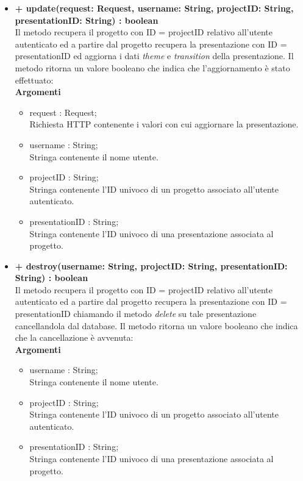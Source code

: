 \begin{itemize}
			\item \textbf{+ update(request: Request, username: String, projectID: String, presentationID: String) : boolean}\\
			Il metodo recupera il progetto con ID = projectID relativo all'utente autenticato ed a partire dal progetto recupera la presentazione con ID = presentationID ed aggiorna i dati \textit{theme} e \textit{transition} della presentazione. Il metodo ritorna un valore booleano che indica che l'aggiornamento è stato effettuato:\\
			\textbf{Argomenti}
			\begin{itemize}
				\item request : Request;\\
				Richiesta HTTP contenente i valori con cui aggiornare la presentazione.
				\item username : String; \\
				Stringa contenente il nome utente.
				\item projectID : String; \\
				Stringa contenente l'ID univoco di un progetto associato all'utente autenticato.
				\item presentationID : String; \\
				Stringa contenente l'ID univoco di una presentazione associata al progetto.
			\end{itemize}
			\newpage
			\item \textbf{+ destroy(username: String, projectID: String, presentationID: String) : boolean}\\
			Il metodo recupera il progetto con ID = projectID relativo all'utente autenticato ed a partire dal progetto recupera la presentazione con ID = presentationID chiamando il metodo \textit{delete} su tale presentazione cancellandola dal \gls{database}. Il metodo ritorna un valore booleano che indica che la cancellazione è avvenuta:\\
			\textbf{Argomenti}
			\begin{itemize}
				\item username : String; \\
				Stringa contenente il nome utente.
				\item projectID : String; \\
				Stringa contenente l'ID univoco di un progetto associato all'utente autenticato.
				\item presentationID : String; \\
				Stringa contenente l'ID univoco di una presentazione associata al progetto.
			\end{itemize}
		\end{itemize}
		
